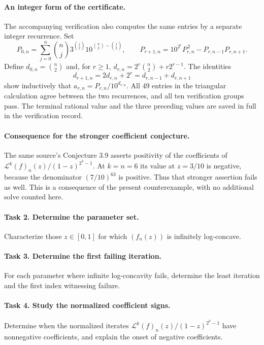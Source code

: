 \documentclass[11pt]{article}
\newcommand{\LL}{\mathcal L}
\begin{document}
\paragraph{An integer form of the certificate.}
The accompanying verification also computes the same entries by a
separate integer recurrence. Set
\[
 P_{0,n}=\sum_{j=0}^n\binom nj3^{\binom j2}
                    10^{\binom n2-\binom j2},
 \qquad
 P_{r+1,n}=10^{2^r}P_{r,n}^{\,2}-P_{r,n-1}P_{r,n+1}.
\]
Define $d_{0,n}=\binom n2$ and, for $r\geq1$,
$d_{r,n}=2^r\binom n2+r2^{r-1}$.
The identities
\[
 d_{r+1,n}=2d_{r,n}+2^r
          =d_{r,n-1}+d_{r,n+1}
\]
show inductively that $a_{r,n}=P_{r,n}/10^{d_{r,n}}$.
All 49 entries in the triangular calculation agree between the two
recurrences, and all ten verification groups pass.
The terminal rational value and the three preceding values are saved
in full in the verification record.

\paragraph{Consequence for the stronger coefficient conjecture.}
The same source's Conjecture 3.9 asserts positivity of the coefficients
of $\LL^k(f)_n(z)/(1-z)^{2^k-1}$.
At $k=n=6$ its value at $z=3/10$ is negative, because the denominator
$(7/10)^{63}$ is positive. Thus that stronger assertion fails as well.
This is a consequence of the present counterexample, with no additional
solve counted here.

\paragraph{Task 2. Determine the parameter set.}
Characterize those $z\in[0,1]$ for which $(f_n(z))$ is infinitely
log-concave.

\paragraph{Task 3. Determine the first failing iteration.}
For each parameter where infinite log-concavity fails, determine the
least iteration and the first index witnessing failure.

\paragraph{Task 4. Study the normalized coefficient signs.}
Determine when the normalized iterates
$\LL^k(f)_n(z)/(1-z)^{2^k-1}$ have nonnegative coefficients, and explain
the onset of negative coefficients.
\end{document}
